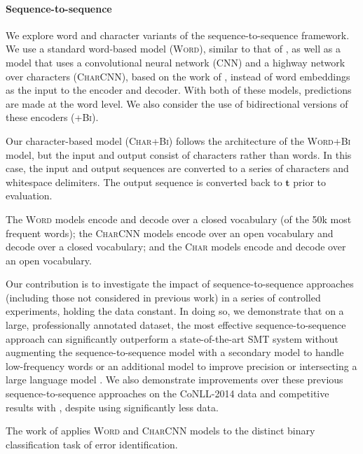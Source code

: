 \documentclass[11pt,letterpaper]{article}
\begin{document}
\paragraph{Sequence-to-sequence}
 
We explore word and character variants of the sequence-to-sequence framework.
 We use a standard word-based model (\textsc{Word}), similar to that of , as well as a model that uses a convolutional neural network (CNN) and a highway network over characters (\textsc{CharCNN}), based on the work of , instead of word embeddings as the input to the encoder and decoder. With both of these models, predictions are made at the word level. We also consider the use of bidirectional versions of these encoders (\textsc{+Bi}). 
 
 Our character-based model (\textsc{Char+Bi}) 
 follows the architecture of the \textsc{Word+Bi} model, but the input and output consist of characters rather than words. In this case, the input and output sequences are converted to a series of characters and whitespace delimiters. The output sequence is converted back to $\mathbf{t}$ prior to evaluation.
 
The \textsc{Word} models encode and decode over a closed vocabulary (of the 50k most frequent words); the \textsc{CharCNN} models encode over an open vocabulary and decode over a closed vocabulary; and the \textsc{Char} models encode and decode over an open vocabulary.  

Our contribution is to investigate the impact of sequence-to-sequence approaches (including those not considered in previous work) in a series of controlled experiments, holding the data constant. In doing so, we demonstrate that on a large, professionally annotated dataset, the most effective sequence-to-sequence approach can significantly outperform a state-of-the-art SMT system without augmenting the sequence-to-sequence model with a secondary model to handle low-frequency words \cite{yuan-briscoe:2016:N16-1} or an additional model to improve precision or intersecting a large language model \cite{XieEtAl.2016-arxiv-NLCwithCharAttention}. We also demonstrate improvements over these previous sequence-to-sequence approaches on the CoNLL-2014 data and competitive results with , despite using significantly less data. 

The work of  applies \textsc{Word} and \textsc{CharCNN} models to the distinct binary classification task of error identification.
\end{document}
